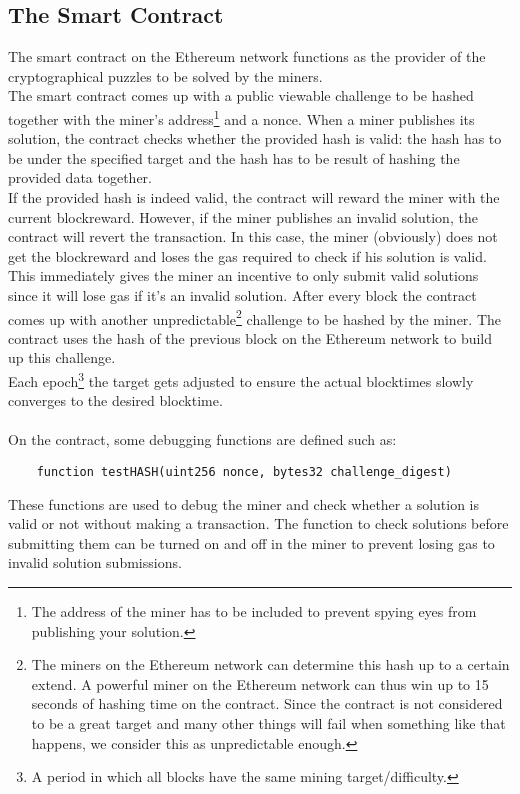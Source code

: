 \documentclass{article}
\begin{document}
\subsection{The Smart Contract}
The smart contract on the Ethereum network functions as the provider of the cryptographical puzzles to be solved by the miners. \\
The smart contract comes up with a public viewable challenge to be hashed together with the miner's address\footnote{The address of the miner has to be included to prevent spying eyes from publishing your solution.} and a nonce. When a miner publishes its solution, the contract checks whether the provided hash is valid: the hash has to be under the specified target and the hash has to be result of hashing the provided data together. \\
If the provided hash is indeed valid, the contract will reward the miner with the current blockreward. However, if the miner publishes an invalid solution, the contract will revert the transaction. In this case, the miner (obviously) does not get the blockreward and loses the gas required to check if his solution is valid. This immediately gives the miner an incentive to only submit valid solutions since it will lose gas if it's an invalid solution. After every block the contract comes up with another unpredictable\footnote{The miners on the Ethereum network can determine this hash up to a certain extend. A powerful miner on the Ethereum network can thus win up to 15 seconds of hashing time on the contract. Since the contract is not considered to be a great target and many other things will fail when something like that happens, we consider this as unpredictable enough.} challenge to be hashed by the miner. The contract uses the hash of the previous block on the Ethereum network to build up this challenge. \\
Each epoch\footnote{A period in which all blocks have the same mining target/difficulty.} the target gets adjusted to ensure the actual blocktimes slowly converges to the desired blocktime. \\
\\
On the contract, some debugging functions are defined such as: \begin{verbatim}
    function testHASH(uint256 nonce, bytes32 challenge_digest)
\end{verbatim}  
These functions are used to debug the miner and check whether a solution is valid or not without making a transaction. The function to check solutions before submitting them can be turned on and off in the miner to prevent losing gas to invalid solution submissions.
\end{document}
